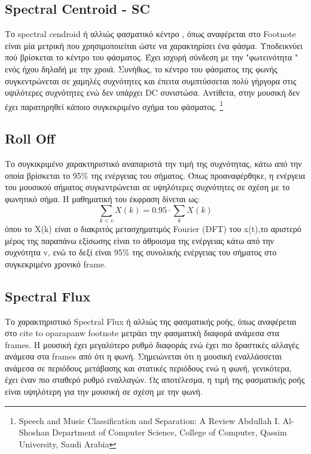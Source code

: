 \subsection{Spectral Centroid - SC}

Το spectral cendroid ή αλλιώς φασματικό κέντρο , όπως αναφέρεται στο Footnote είναι μία μετρική που χρησιμοποιείται ώστε να χαρακτηρίσει ένα φάσμα. Υποδεικνύει πού βρίσκεται το κέντρο του φάσματος. Έχει ισχυρή σύνδεση με την "φωτεινότητα " ενός ήχου δηλαδή με την χροιά. Συνήθως, το κέντρο του φάσματος της φωνής συγκεντρώνεται σε χαμηλές συχνότητες και έπειτα συμπτύσσεται πολύ γήργορα στις υψιλότερες συχνότητες ενώ δεν υπάρχει DC συνιστώσα. Αντίθετα, στην μουσική δεν έχει παρατηρηθεί κάποιο συγκεκριμένο σχήμα του φάσματος. \footnote{
Speech and Music Classification and Separation: A Review 
Abdullah I. Al-Shoshan
Department of Computer Science, College of Computer, 
Qassim University, Saudi Arabia }

 
\subsection{Roll Off}
 
 Το συγκικριμένο χαρακτηριστικό αναπαριστά την τιμή της συχνότητας, κάτω από την οποία βρίσκεται το 95\% της ενέργειας του σήματος. Όπως προαναφέρθηκε, η ενέργεια του μουσικού σήματος συγκεντρώνεται σε υψηλότερες συχνότητες σε σχέση με το φωνητικό σήμα. Η μαθηματική του έκφραση δίνεται ως:
 \begin{equation}
 \sum_{k<v} X(k) = 0.95 \cdot \sum_{k}X(k)
 \end{equation}
 όπου το X(k) είναι ο διακριτός μετασχηματιμός Fourier (DFT) του x(t),το αριστερό μέρος της παραπάνω εξίσωσης είναι το άθροισμα της ενέργειας κάτω από την συχνότητα v, ενώ το δεξί είναι 95\% της συνολικής ενέργειας του σήματος στο συγκεκριμένο χρονικό frame.

 \subsection{Spectral Flux}

 Το χαρακτηριστικό Spectral Flux ή αλλιώς της φασματικής ροής, όπως αναφέρεται στο 
 cite to oparapanw footnote
 μετράει την φασματική διαφορά ανάμεσα στα frames. Η μουσική έχει μεγαλύτερο ρυθμό διαφοράς ενώ έχει πιο δραστικές αλλαγές ανάμεσα στα frames από ότι η φωνή. Σημειώνεται ότι η μουσική εναλλάσσεται ανάμεσα σε περιόδους μετάβασης και στατικές περιόδους ενώ η φωνή, γενικότερα, έχει έναν πιο σταθερό ρυθμό εναλλαγών. Ως αποτέλεσμα, η τιμή της φασματικής ροής είναι υψηλότερη για την μουσική σε σχέση με την φωνή.

